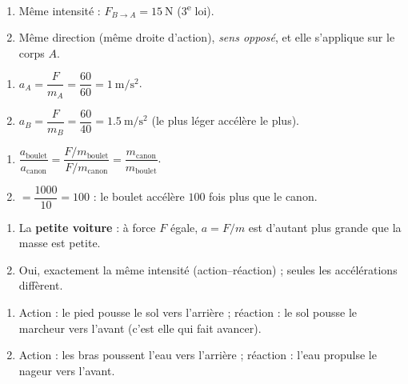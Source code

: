 \documentclass[11pt,a4paper]{article}
\begin{document}

\begin{corrige}
\begin{enumerate}[label=\alph*)]
  \item Même intensité : $F_{B\to A}=\qty{15}{\newton}$ (3\textsuperscript{e} loi).
  \item Même direction (même droite d'action), \emph{sens opposé}, et elle s'applique sur le corps $A$.
\end{enumerate}
\end{corrige}

\begin{corrige}
\begin{enumerate}[label=\alph*)]
  \item $a_A=\dfrac{F}{m_A}=\dfrac{60}{60}=\qty{1}{\metre\per\second\squared}$.
  \item $a_B=\dfrac{F}{m_B}=\dfrac{60}{40}=\qty{1,5}{\metre\per\second\squared}$ (le plus léger accélère le plus).
\end{enumerate}
\end{corrige}

\begin{corrige}
\begin{enumerate}[label=\alph*)]
  \item $\dfrac{a_{\text{boulet}}}{a_{\text{canon}}}=\dfrac{F/m_{\text{boulet}}}{F/m_{\text{canon}}}
        =\dfrac{m_{\text{canon}}}{m_{\text{boulet}}}$.
  \item $=\dfrac{1000}{10}=100$ : le boulet accélère $100$ fois plus que le canon.
\end{enumerate}
\end{corrige}

\begin{corrige}
\begin{enumerate}[label=\alph*)]
  \item La \textbf{petite voiture} : à force $F$ égale, $a=F/m$ est d'autant plus grande que la masse est petite.
  \item Oui, exactement la même intensité (action--réaction) ; seules les accélérations diffèrent.
\end{enumerate}
\end{corrige}

\begin{corrige}
\begin{enumerate}[label=\alph*)]
  \item Action : le pied pousse le sol vers l'arrière ; réaction : le sol pousse le marcheur vers l'avant (c'est elle qui fait avancer).
  \item Action : les bras poussent l'eau vers l'arrière ; réaction : l'eau propulse le nageur vers l'avant.
\end{enumerate}
\end{corrige}
\end{document}
